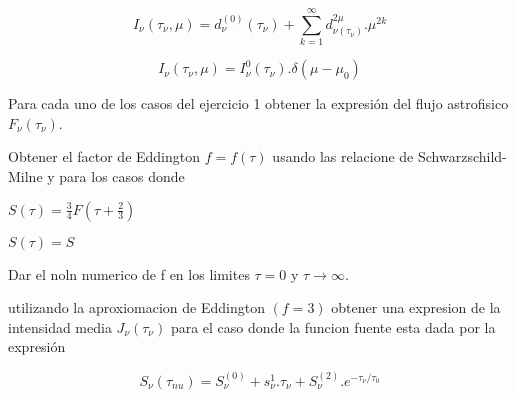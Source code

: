 \documentclass[12pt,spanish,a4paper]{practice}
\begin{document}
\begin{problem}
        \begin{ppart}\label{prob:1:d}
            \begin{equation*}
                I_{\nu}(\tau_{\nu},\mu) = d_{\nu}^{(0)}(\tau_{\nu}) + \sum_{k=1}^{\infty} d_{\nu (\tau_{\nu})}^{2\mu} . \mu^{2k}
            \end{equation*}
        \end{ppart}

        \begin{ppart}\label{prob:1:e}
            \begin{equation*}
                I_{\nu}(\tau_{\nu},\mu) = I_{\nu}^{0}(\tau_{\nu}) . \delta(\mu - \mu_{0})
            \end{equation*}
        \end{ppart}
    \end{problem}

    \begin{problem}\label{prob:2}
        Para cada uno de los casos del ejercicio 1 obtener la expresión del flujo astrofisico $F_{\nu}(\tau_{\nu})$.
    \end{problem}
    
    \begin{problem}\label{prob:3}
        Obtener el factor de Eddington $f=f(\tau)$ usando las relacione de Schwarzschild-Milne y para los casos donde

        \begin{ppart}\label{prob:3:a}
                $S(\tau) = \frac{3}{4}F(\tau + \frac{2}{3})$
        \end{ppart}

        \begin{ppart}\label{prob:3:b}
            $S(\tau) = S$
        \end{ppart}

        
        Dar el noln numerico de f en los limites $\tau = 0$ y $\tau \to \infty$.
    \end{problem}
    
    \begin{problem}\label{prob:4}
        
        utilizando la aproxiomacion de Eddington $(f = 3)$ obtener una expresion de la intensidad media $J_{\nu}(\tau_{\nu})$ para el caso donde la funcion fuente esta dada por la expresión 

        $$S_{\nu}(\tau_{nu}) = S_{\nu}^{(0)} + s_{\nu}^{1}.\tau_{\nu} + S_{\nu}^{(2)}.e^{-\tau_{\nu} / \tau_{0}}$$

    \end{problem}
    
\end{document}
